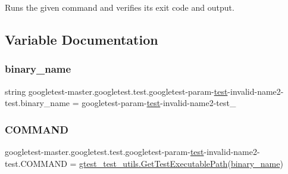 \begin{DoxyVerb}Runs the given command and verifies its exit code and output.\end{DoxyVerb}
 

\subsection{Variable Documentation}
\mbox{\label{namespacegoogletest-master_1_1googletest_1_1test_1_1googletest-param-test-invalid-name2-test_a4deb61f803e1e11f24a9a8b80b5eba13}} 
\subsubsection{\texorpdfstring{binary\_name}{binary\_name}}
{\footnotesize\ttfamily string googletest-\/master.\+googletest.\+test.\+googletest-\/param-\/\mbox{\hyperlink{_mutual_8h_a707ee03719e99670bf6cfdfd897b8456}{test}}-\/invalid-\/name2-\/test.\+binary\+\_\+name = \textquotesingle{}googletest-\/param-\/\mbox{\hyperlink{_mutual_8h_a707ee03719e99670bf6cfdfd897b8456}{test}}-\/invalid-\/name2-\/test\+\_\+\textquotesingle{}}

\mbox{\label{namespacegoogletest-master_1_1googletest_1_1test_1_1googletest-param-test-invalid-name2-test_a7525b00697d99622d0a6d23c192d5444}} 
\subsubsection{\texorpdfstring{COMMAND}{COMMAND}}
{\footnotesize\ttfamily googletest-\/master.\+googletest.\+test.\+googletest-\/param-\/\mbox{\hyperlink{_mutual_8h_a707ee03719e99670bf6cfdfd897b8456}{test}}-\/invalid-\/name2-\/test.\+C\+O\+M\+M\+A\+ND = \mbox{\hyperlink{namespacegoogletest-master_1_1googletest_1_1test_1_1gtest__test__utils_a78bbc69ac699e750a6a29188caa643c4}{gtest\+\_\+test\+\_\+utils.\+Get\+Test\+Executable\+Path}}(\mbox{\hyperlink{namespacegoogletest-master_1_1googletest_1_1test_1_1googletest-param-test-invalid-name2-test_a4deb61f803e1e11f24a9a8b80b5eba13}{binary\+\_\+name}})}


